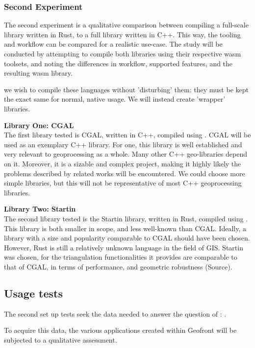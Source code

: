 
\subsubsection{Second Experiment}
The second experiment is a qualitative comparison between compiling a full-scale library written in Rust, to a full library written in C++. 
This way, the tooling and workflow can be compared for a realistic use-case. 
The study will be conducted by attempting to compile both libraries using their respective \ac{wasm} toolsets, and noting the differences in workflow, supported features, and the resulting wasm library. 

we wish to compile these languages without 'disturbing' them: they must be kept the exact same for normal, native usage. 
We will instead create 'wrapper' libraries. 

\textbf{Library One: CGAL} \\
The first library tested is CGAL, written in C++, compiled using .
CGAL will be used as an exemplary C++ library. 
For one, this library is well established and very relevant to geoprocessing as a whole. 
Many other C++ geo-libraries depend on it.
Moreover, it is a sizable and complex project, making it highly likely the problems described by related works will be encountered. 
We could choose more simple libraries, but this will not be representative of most C++ geoprocessing libraries. 

\textbf{Library Two: Startin} \\
The second library tested is the Startin library, written in Rust, compiled using .  
This library is both smaller in scope, and less well-known than CGAL. 
Ideally, a library with a size and popularity comparable to CGAL should have been chosen.
However, Rust is still a relatively unknown language in the field of GIS. 
Startin was chosen, for the triangulation functionalities it provides are comparable to that of CGAL, in terms of performance, and geometric robustness (Source). 

\subsection{Usage tests}

The second set up tests seek the data needed to answer the question of \mySubRQFourTitle: \mySubRQFour.

To acquire this data, the various applications created within Geofront will be subjected to a qualitative assessment. 


